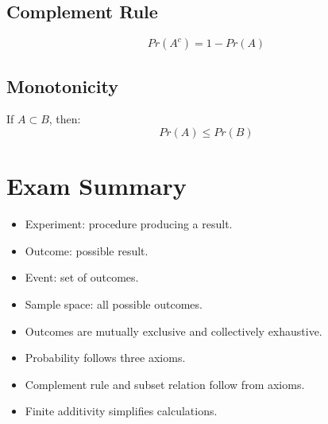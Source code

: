 \documentclass[12pt]{article}
\begin{document}
\subsection{Complement Rule}
\[
Pr(A^c) = 1 - Pr(A)
\]

\subsection{Monotonicity}
If $A \subset B$, then:
\[
Pr(A) \leq Pr(B)
\]


\section*{Exam Summary}

\begin{itemize}
\item Experiment: procedure producing a result.
\item Outcome: possible result.
\item Event: set of outcomes.
\item Sample space: all possible outcomes.
\item Outcomes are mutually exclusive and collectively exhaustive.
\item Probability follows three axioms.
\item Complement rule and subset relation follow from axioms.
\item Finite additivity simplifies calculations.
\end{itemize}
\end{document}
